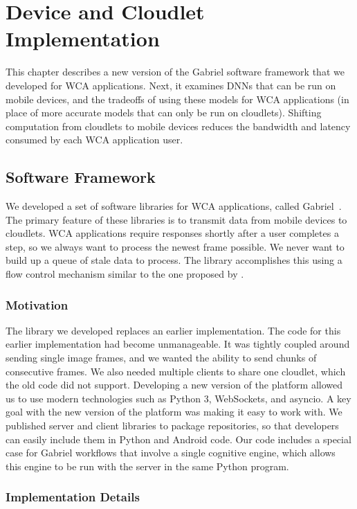 \chapter{Device and Cloudlet Implementation}

This chapter describes a new version of the Gabriel software framework that we
developed for WCA applications.
Next, it examines DNNs that can be run on mobile devices, and the tradeoffs of
using these models for WCA applications (in place of more accurate models that
can only be run on cloudlets).
Shifting computation from cloudlets to mobile devices reduces the bandwidth and
latency consumed by each WCA application user.

\section{Software Framework}

We developed a set of software libraries for WCA applications, called
Gabriel~\cite{gabriel_github}.
The primary feature of these libraries is to transmit data from mobile devices
to cloudlets.
WCA applications require responses shortly after a user completes a step, so
we always want to process the newest frame possible. We never want to build up
a queue of stale data to process. The library accomplishes this using a flow
control mechanism similar to the one proposed by \citet{ha2014}.

\subsection{Motivation}

The library we developed replaces an earlier implementation.
The code for this earlier implementation had become unmanageable.
It was tightly coupled around sending single image frames, and we
wanted the ability to send chunks of consecutive frames.
We also needed multiple clients to share one cloudlet, which the old code did
not support.
Developing a new version of the platform allowed us to use modern technologies
such as Python 3, WebSockets, and asyncio.
A key goal with the new version of the platform was making it easy to work with.
We published server and client libraries to package repositories, so that
developers can easily include them in Python and Android code.
Our code includes a special case for Gabriel workflows that involve a single
cognitive engine, which allows this engine to be run with the server in the same
Python program.

\subsection{Implementation Details}


